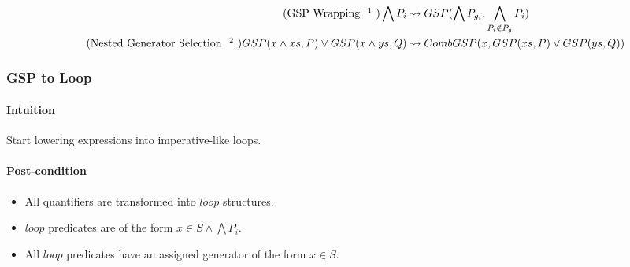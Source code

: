 \documentclass{article}
\begin{document}
\noindent\begin{minipage}{\linewidth}
\begin{align}
  \tag{GSP Wrapping \footnote{GSP is a tuple-like structure, where all entries can be flattened into an AND. The LH term must occur inside a quantifier's predicate - one generator per top-level or-clause. Chained generators may be necessary to allow for nested loop operations (ie. non-top-level clauses may require generators). $P_g$ is a list of chained generators, specific set membership clauses (of form $x \in S$) distinguished from the rest of $\bigwedge P_i$. Currently, the selection of $P_g$ is arbitrary (and thus the rewrite system is not confluent), but heurestics may be added later to choose better generators.}}
  \bigwedge P_i
  &\leadsto
  GSP(\bigwedge P_{g_i}, \bigwedge_{P_i \notin P_g} P_i)
  \\
  \tag{Nested Generator Selection \footnote{$free$ is a function that returns true when variables in the predicate are defined (either bound by the current generator or bound prior to the current statement)}}
  GSP(x \land xs, P) \lor GSP(x \land ys, Q)
  &\leadsto
  CombGSP(x, GSP(xs, P) \lor GSP(ys, Q))
\end{align}
\end{minipage}



\subsubsection{GSP to Loop}

\paragraph{Intuition} Start lowering expressions into imperative-like loops.

\paragraph{Post-condition}
\begin{itemize}
  \item All quantifiers are transformed into $loop$ structures.
  \item $loop$ predicates are of the form $x \in S \land \bigwedge P_i$.
  \item All $loop$ predicates have an assigned generator of the form $x \in S$.
\end{itemize}
\end{document}
